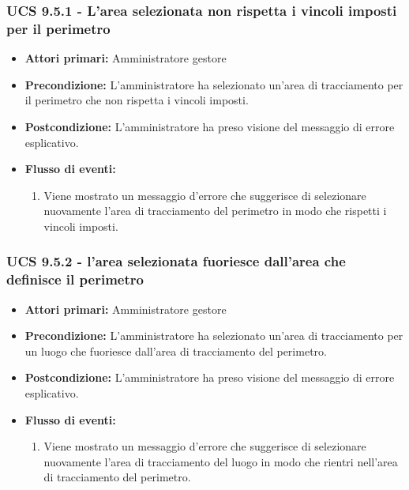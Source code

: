 \subsubsection{UCS 9.5.1 - L'area selezionata non rispetta i vincoli imposti per il perimetro}%
\begin{itemize}
\item \textbf{Attori primari:} Amministratore gestore
\item \textbf{Precondizione:} L'amministratore ha selezionato un'area di tracciamento per il perimetro che non rispetta i vincoli imposti.
\item \textbf{Postcondizione:} L'amministratore ha preso visione del messaggio di errore esplicativo.
\item \textbf{Flusso di eventi:}
    \begin{enumerate}
    \item Viene mostrato un messaggio d'errore che suggerisce di selezionare nuovamente l'area di tracciamento del perimetro in modo che rispetti i vincoli imposti.
    \end{enumerate} 
\end{itemize}

\subsubsection{UCS 9.5.2 - l'area selezionata fuoriesce dall'area che definisce il perimetro}%
\begin{itemize}
\item \textbf{Attori primari:} Amministratore gestore
\item \textbf{Precondizione:} L'amministratore ha selezionato un'area di tracciamento per un luogo che fuoriesce dall'area di tracciamento del perimetro.
\item \textbf{Postcondizione:} L'amministratore ha preso visione del messaggio di errore esplicativo.
\item \textbf{Flusso di eventi:}
    \begin{enumerate}
    \item Viene mostrato un messaggio d'errore che suggerisce di selezionare nuovamente l'area di tracciamento del luogo in modo che rientri nell'area di tracciamento del perimetro.
    \end{enumerate} 
\end{itemize}

